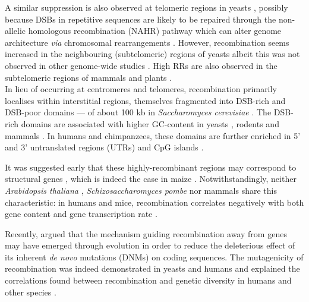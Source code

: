 A similar suppression is also observed at telomeric regions in yeasts \citep{blitzblau2007mapping,buhler2007mapping}, possibly because DSBs in repetitive sequences are likely to be repaired through the non-allelic homologous recombination (NAHR) pathway which can alter genome architecture \textit{via} chromosomal rearrangements \citep{sasaki2010genome}.
However, recombination seems increased in the neighbouring (subtelomeric) regions of yeasts \citep{chen2008global,barton2008meiotic} albeit this was not observed in other genome-wide studies \citep{buhler2001dna,pan2011hierarchical}.
High RRs are also observed in the subtelomeric regions of mammals \citep{kong2002highresolution,jensen-seaman2004comparative,pratto2014recombination} and plants \citep{giraut2011genomewide}.\\



In lieu of occurring at centromeres and telomeres, recombination primarily localises within interstitial regions, themselves fragmented into DSB-rich and DSB-poor domains — of about 100 kb in \textit{Saccharomyces cerevisiae} \citep{baudat1997clustering,borde1999use}.
The DSB-rich domains are associated with higher GC-content in yeasts \citep{gerton2000global,petes2001meiotic,marsolier-kergoat2009gc}, rodents \citep{jensen-seaman2004comparative} and mammals \citep{eyre-walker1993recombination,fullerton2001local}.
In humans and chimpanzees, these domains are further enriched in 5’ and 3’ untranslated regions (UTRs) and CpG islands \citep{kong2002highresolution, auton2012finescale}.

It was suggested early that these highly-recombinant regions may correspond to structural genes \citep{thuriaux1977recombination}, which is indeed the case in maize \citep[reviewed in \citealp{okagaki2018critical}]{nelson1959intracistron, nelson1962waxy, nelson1975waxy, dooner1997recombination, dooner2008maize}.
Notwithstandingly, neither \textit{Arabidopsis thaliana} \citep{kim2007recombination,horton2012genomewide}, \textit{Schizosaccharomyces pombe} \citep{cromie2007discrete} nor mammals \citep{mcvean2004finescale,myers2005finescale,brick2012genetic} share this characteristic: in humans and mice, recombination correlates negatively with both gene content \citep{kong2002highresolution,jensen-seaman2004comparative} and gene transcription rate \citep{mcvicker2010genomic}.

Recently, \citet{halldorsson2019characterizing} argued that the mechanism guiding recombination away from genes may have emerged through evolution in order to reduce the deleterious effect of its inherent \textit{de novo} mutations (DNMs) on coding sequences. 
The mutagenicity of recombination was indeed demonstrated in yeasts \citep{strathern1995dna} and humans \citep{arbeithuber2015crossovers} and explained the correlations found between recombination and genetic diversity in humans \citep{nachman2001single,lercher2002human,hellmann2003neutral,hellmann2005why,spencer2006influence,duret2008impact,montgomery2013origin} and other species \citep{begun1992levels,aquadro1997insights,webster2012direct,cutter2013genomic}.\\


